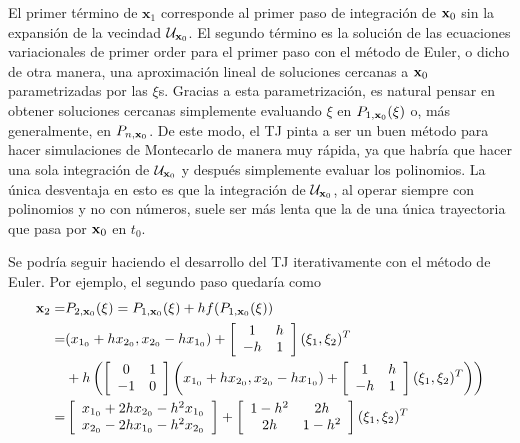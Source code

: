 El primer término de $\mathbf{x}_1$ corresponde al primer paso de integración de $\mathbf{x}_0$ sin la expansión de la vecindad $\mathcal{U}_{\mathbf{x}_0}$. El segundo término es la solución de las ecuaciones variacionales de primer order para el primer paso con el método de Euler, o dicho de otra manera, una aproximación lineal de soluciones cercanas a $\mathbf{x}_0$ parametrizadas por las $\xi$s. Gracias a esta parametrización, es natural pensar en obtener soluciones cercanas simplemente evaluando $\xi$ en $P_{1,\mathbf{x}_0}(\xi)$ o, más generalmente, en $P_{n,\mathbf{x}_0}$. De este modo, el TJ pinta a ser un buen método para hacer simulaciones de Montecarlo de manera muy rápida, ya que habría que hacer una sola integración de $\mathcal{U}_{\mathbf{x}_0}$ y después simplemente evaluar los polinomios. La única desventaja en esto es que la integración de $\mathcal{U}_{\mathbf{x}_0}$, al operar siempre con polinomios y no con números, suele ser más lenta que la de una única trayectoria que pasa por $\mathbf{x}_0$ en $t_0$.

Se podría seguir haciendo el desarrollo del TJ iterativamente con el método de Euler. Por ejemplo, el segundo paso quedaría como 
\begin{align*}
\mathbf{x}_2 =& P_{2,\mathbf{x}_0}(\xi) = P_{1,\mathbf{x}_0}(\xi) + h f(P_{1,\mathbf{x}_0}(\xi)) \\
=& (x_{1_0} + h x_{2_0}, x_{2_0} - h x_{1_0}) + \left[ \begin{array}{cc}
 1 & h  \\
-h & 1  \\
\end{array} \right] (\xi_1,\xi_2)^T \\ 
&+ h \left( \left[ \begin{array}{cc}
 0 & 1  \\
-1 & 0  \\
\end{array} \right] \left( x_{1_0} + h x_{2_0}, x_{2_0} - h x_{1_0}) + \left[ \begin{array}{cc}
 1 & h  \\
-h & 1  \\
\end{array} \right] (\xi_1,\xi_2)^T \right) \right) \\
=& \left[ \begin{array}{c}
x_{1_0} + 2h x_{2_0} - h^2x_{1_0}  \\
x_{2_0} - 2h x_{1_0} - h^2x_{2_0}  \\
\end{array} \right] + \left[ \begin{array}{cc}
 1-h^2 & 2h  \\
2h & 1-h^2  \\
\end{array} \right] (\xi_1,\xi_2)^T
\end{align*}
 
